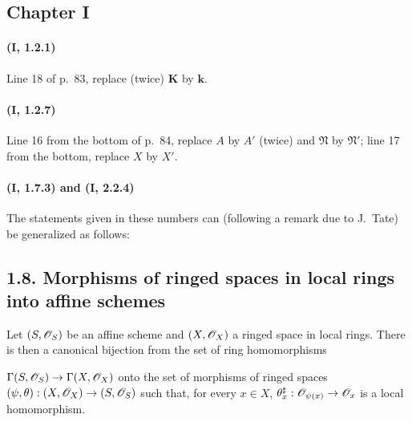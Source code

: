 \subsection*{Chapter I}

\paragraph{(\textbf{I}, 1.2.1)}
Line 18 of p.~83, replace (twice) $\boldsymbol{K}$ by $\boldsymbol{k}$.

\paragraph{(\textbf{I}, 1.2.7)}
Line 16 from the bottom of p.~84, replace $A$ by $A'$ (twice) and
$\mathfrak N$ by $\mathfrak N'$; line 17 from the bottom, replace $X$ by
$X'$.

\paragraph{(\textbf{I}, 1.7.3) \textmd{and} (\textbf{I}, 2.2.4)}
The statements given in these numbers can (following a remark due to
J.~Tate) be generalized as follows:

\subsection*{1.8. Morphisms of ringed spaces in local rings into affine schemes}
\label{ega2:addendum:subsection:I.1.8}

\begin{proposition}[1.8.1]
\label{ega2:addendum:I.1.8.1}
Let $(S,\mathscr{O}_S)$ be an affine scheme and $(X,\mathscr{O}_X)$ a ringed space
in local rings. There is then a canonical bijection from the set
of ring homomorphisms
 $\Gamma(S,\mathscr{O}_S)\to\Gamma(X,\mathscr{O}_X)$
onto the set of morphisms of ringed spaces
$(\psi,\theta):(X,\mathscr{O}_X)\to(S,\mathscr{O}_S)$ such that, for every
$x\in X$, $\theta_x^\sharp:\mathscr{O}_{\psi(x)}\to\mathscr{O}_x$ is a
local homomorphism.
\end{proposition}

